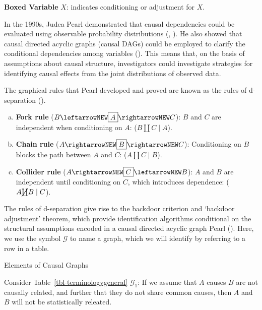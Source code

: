 \documentclass[
  single column]{article}
\begin{document}
\textbf{Boxed Variable} \(\boxed{X}\): indicates conditioning or
adjustment for \(X\).

In the 1990s, Judea Pearl demonstrated that causal dependencies could be
evaluated using observable probability distributions
(, ).
He also showed that causal directed acyclic graphs (causal DAGs) could
be employed to clarify the conditional dependencies among variables
(). This means that, on the basis of
assumptions about causal structure, investigators could investigate
strategies for identifying causal effects from the joint distributions
of observed data.

The graphical rules that Pearl developed and proved are known as the
rules of d-separation ().

\begin{enumerate}[a)]
     \item  {\bf Fork rule} ($B \leftarrowNEW \boxed{A} \rightarrowNEW C$): $B$ and $C$ are independent when conditioning on $A$: ($B \coprod C \mid A$).
     \item  {\bf Chain rule} ($A \rightarrowNEW \boxed{B} \rightarrowNEW C$): Conditioning on $B$ blocks the path between $A$ and $C$: ($A \coprod C \mid B$).
     \item  {\bf Collider rule} ($A \rightarrowNEW \boxed{C} \leftarrowNEW B$): $A$ and $B$ are independent until conditioning on $C$, which introduces dependence: ($A \cancel{\coprod} B \mid C$). 
 \end{enumerate}

The rules of d-separation give rise to the backdoor criterion and
`backdoor adjustment' theorem, which provide identification algorithms
conditional on the structural assumptions encoded in a causal directed
acyclic graph Pearl (). Here, we use the
symbol \(\mathcal{G}\) to name a graph, which we will identify by
referring to a row in a table.

\begin{table}

\caption{\label{tbl-terminologygeneral}Elements of Causal Graphs}

\centering{

\terminologydirectedgraph

}

\end{table}%

Consider Table~\ref{tbl-terminologygeneral} \(\mathcal{G}_1\): If we
assume that \(A\) causes \(B\) are not causally related, and further
that they do not share common causes, then \(A\) and \(B\) will not be
statistically releated.
\end{document}
